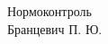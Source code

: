 \par\vspace*{\fill}

\begin{flushleft}
  Нормоконтроль\\[1em]
  Бранцевич П. Ю.
\end{flushleft}

\clearpage
